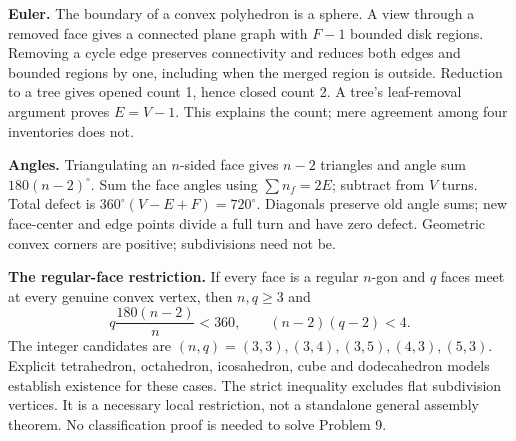\documentclass[11pt,letterpaper]{article}
\newcommand{\degc}{^{\circ}}
\begin{document}
\textbf{Euler.} The boundary of a convex polyhedron is a sphere. A view through a removed face gives a connected plane graph with $F-1$ bounded disk regions. Removing a cycle edge preserves connectivity and reduces both edges and bounded regions by one, including when the merged region is outside. Reduction to a tree gives opened count 1, hence closed count 2. A tree's leaf-removal argument proves $E=V-1$. This explains the count; mere agreement among four inventories does not.

\textbf{Angles.} Triangulating an $n$-sided face gives $n-2$ triangles and angle sum $180(n-2)\degc$. Sum the face angles using $\sum n_f=2E$; subtract from $V$ turns. Total defect is $360\degc(V-E+F)=720\degc$. Diagonals preserve old angle sums; new face-center and edge points divide a full turn and have zero defect. Geometric convex corners are positive; subdivisions need not be.

\textbf{The regular-face restriction.} If every face is a regular $n$-gon and $q$ faces meet at every genuine convex vertex, then $n,q\geq3$ and
\[
q\frac{180(n-2)}{n}<360,\qquad (n-2)(q-2)<4.
\]
The integer candidates are $(n,q)=(3,3),(3,4),(3,5),(4,3),(5,3)$. Explicit tetrahedron, octahedron, icosahedron, cube and dodecahedron models establish existence for these cases. The strict inequality excludes flat subdivision vertices. It is a necessary local restriction, not a standalone general assembly theorem. No classification proof is needed to solve Problem 9.
\end{document}
